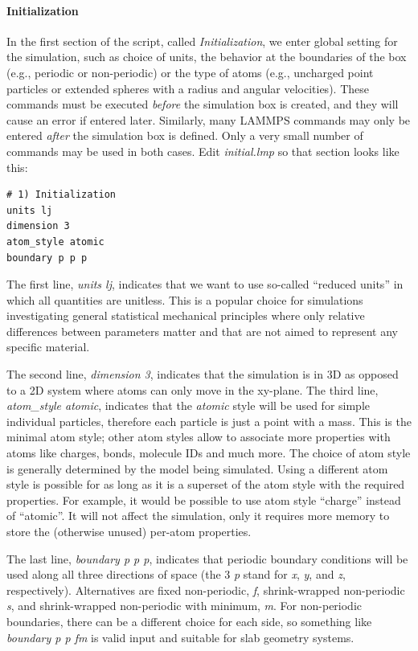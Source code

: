 \documentclass[9pt,tutorial]{livecoms}
\begin{document}
\paragraph{Initialization}

In the first section of the script, called \textit{Initialization}, we
enter global setting for the simulation, such as choice of units, the
behavior at the boundaries of the box (e.g., periodic or non-periodic)
or the type of atoms (e.g., uncharged point particles or extended
spheres with a radius and angular velocities).  These commands must be
executed \emph{before} the simulation box is created, and they will
cause an error if entered later.  Similarly, many LAMMPS commands may
only be entered \emph{after} the simulation box is defined.  Only a very
small number of commands may be used in both cases.  Edit
\textit{initial.lmp} so that section looks like this:
{\normalsize
\begin{verbatim}
# 1) Initialization
units lj
dimension 3
atom_style atomic
boundary p p p
\end{verbatim}
}

The first line, \textit{units lj}, indicates that we want to use
so-called ``reduced units'' in which all quantities are unitless.  This
is a popular choice for simulations investigating general statistical
mechanical principles where only relative differences between parameters
matter and that are not aimed to represent any specific material.

The second line, \textit{dimension 3}, indicates that the simulation is
in 3D as opposed to a 2D system where atoms can only move in the
xy-plane.  The third line, \textit{atom\_style atomic}, indicates that
the \textit{atomic} style will be used for simple individual particles,
therefore each particle is just a point with a mass.  This is the
minimal atom style; other atom styles allow to associate more properties
with atoms like charges, bonds, molecule IDs and much more.  The choice
of atom style is generally determined by the model being simulated.
Using a different atom style is possible for as long as it is a superset
of the atom style with the required properties.  For example, it would
be possible to use atom style ``charge'' instead of ``atomic''.  It will
not affect the simulation, only it requires more memory to store the
(otherwise unused) per-atom properties.

The last line, \textit{boundary p p p}, indicates that periodic boundary
conditions will be used along all three directions of space (the 3
\textit{p} stand for \textit{x}, \textit{y}, and \textit{z},
respectively).  Alternatives are fixed non-periodic, \textit{f},
shrink-wrapped non-periodic \textit{s}, and shrink-wrapped non-periodic
with minimum, \textit{m}.  For non-periodic boundaries, there can be a
different choice for each side, so something like \textit{boundary p p
  fm} is valid input and suitable for slab geometry systems.
\end{document}
